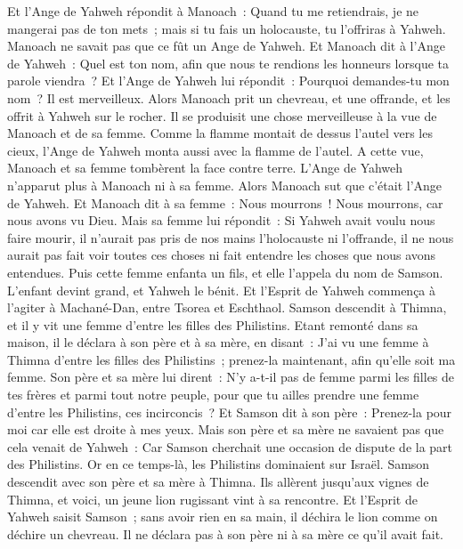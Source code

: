 \begin{multicols}{2}
Et l'Ange de Yahweh répondit à Manoach~: Quand tu me retiendrais, je ne mangerai pas de ton mets~; mais si tu fais un holocauste, tu l'offriras à Yahweh. Manoach ne savait pas que ce fût un Ange de Yahweh.
Et Manoach dit à l'Ange de Yahweh~: Quel est ton nom, afin que nous te rendions les honneurs lorsque ta parole viendra~?
Et l'Ange de Yahweh lui répondit~: Pourquoi demandes-tu mon nom~? Il est merveilleux.
Alors Manoach prit un chevreau, et une offrande, et les offrit à Yahweh sur le rocher. Il se produisit une chose merveilleuse à la vue de Manoach et de sa femme.
Comme la flamme montait de dessus l'autel vers les cieux, l'Ange de Yahweh monta aussi avec la flamme de l'autel. A cette vue, Manoach et sa femme tombèrent la face contre terre.
L'Ange de Yahweh n'apparut plus à Manoach ni à sa femme. Alors Manoach sut que c'était l'Ange de Yahweh.
Et Manoach dit à sa femme~: Nous mourrons~! Nous mourrons, car nous avons vu Dieu.
Mais sa femme lui répondit~: Si Yahweh avait voulu nous faire mourir, il n'aurait pas pris de nos mains l'holocauste ni l'offrande, il ne nous aurait pas fait voir toutes ces choses ni fait entendre les choses que nous avons entendues.
Puis cette femme enfanta un fils, et elle l'appela du nom de Samson. L'enfant devint grand, et Yahweh le bénit.
Et l'Esprit de Yahweh commença à l'agiter à Machané-Dan, entre Tsorea et Eschthaol.
\VerseOne{}Samson descendit à Thimna, et il y vit une femme d'entre les filles des Philistins.
Etant remonté dans sa maison, il le déclara à son père et à sa mère, en disant~: J'ai vu une femme à Thimna d'entre les filles des Philistins~; prenez-la maintenant, afin qu'elle soit ma femme.
Son père et sa mère lui dirent~: N'y a-t-il pas de femme parmi les filles de tes frères et parmi tout notre peuple, pour que tu ailles prendre une femme d'entre les Philistins, ces incirconcis~? Et Samson dit à son père~: Prenez-la pour moi car elle est droite à mes yeux.
Mais son père et sa mère ne savaient pas que cela venait de Yahweh~: Car Samson cherchait une occasion de dispute de la part des Philistins. Or en ce temps-là, les Philistins dominaient sur Israël.
Samson descendit avec son père et sa mère à Thimna. Ils allèrent jusqu'aux vignes de Thimna, et voici, un jeune lion rugissant vint à sa rencontre.
Et l'Esprit de Yahweh saisit Samson~; sans avoir rien en sa main, il déchira le lion comme on déchire un chevreau. Il ne déclara pas à son père ni à sa mère ce qu'il avait fait.

\end{multicols}
